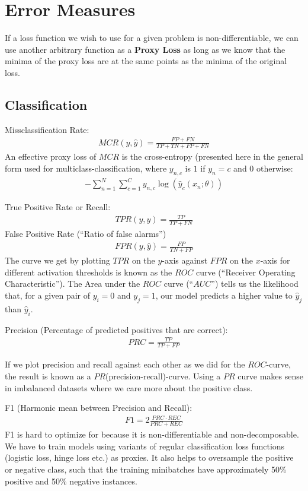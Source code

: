 \documentclass{report}
\newcommand{\tbf}{\textbf}
\newcommand*{\newpar}{\par\vspace{\baselineskip}\noindent}
\newcommand{\yhat}{\hat{y}}
\begin{document}
\chapter{Error Measures}
If a loss function we wish to use for a given problem is non-differentiable, we can use another arbitrary function as a \tbf{Proxy Loss} as long as we know that the minima of the proxy loss are at the same points as the minima of the original loss.
%
\section{Classification}
Missclassification Rate:
\begin{align}
 MCR(y,\yhat) = \frac{FP + FN}{TP+TN+FP+FN}
\end{align}
An effective proxy loss of $MCR$ is the cross-entropy (presented here in the general form used for multiclass-classification, where $y_{n,c}$ is $1$ if $y_n = c$ and $0$ otherwise:
\begin{align}
 - \sum_{n=1}^N \sum_{c=1}^C y_{n,c} \log(\yhat_c(x_n;\theta))
\end{align}

\newpar
True Positive Rate or Recall:
\begin{align}
 TPR(y,\yhat) = \frac{TP}{TP+FN}
\end{align}
False Positive Rate (``Ratio of false alarms'')
\begin{align}
 FPR(y,\yhat) = \frac{FP}{TN+FP}
\end{align}
The curve we get by plotting $TPR$ on the $y$-axis against $FPR$ on the $x$-axis for different activation thresholds is known as the $ROC$ curve (``Receiver Operating Characteristic''). The Area under the $ROC$ curve (``$AUC$'') tells us the likelihood that, for a given pair of $y_i = 0$ and $y_j = 1$, our model predicts a higher value to $\yhat_j$ than $\yhat_i$.
\newpar
Precision (Percentage of predicted positives that are correct):
\begin{align}
 PRC = \frac{TP}{TP+FP}
\end{align}
\newpar
If we plot precision and recall against each other as we did for the $ROC$-curve, the result is known as a $PR$(precision-recall)-curve. Using a $PR$ curve makes sense in imbalanced datasets where we care more about the positive class.
\newpar
F1 (Harmonic mean between Precision and Recall):
\begin{align}
 F1 = 2\frac{PRC \cdot REC}{PRC + REC}
\end{align}
F1 is hard to optimize for because it is non-differentiable and non-decomposable. We have to train models using variants of regular classification loss functions (logistic loss, hinge loss etc.) as proxies. It also helps to oversample the positive or negative class, such that the training minibatches have approximately 50\% positive and 50\% negative instances.
\end{document}
